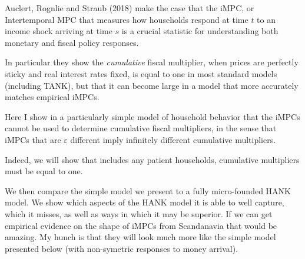 \documentclass{article}
\begin{document}
Auclert, Rognlie and Straub (2018) make the case that the iMPC, or Intertemporal MPC that measures how households respond at time $t$ to an income shock arriving at time $s$ is a crucial statistic for understanding both monetary and fiscal policy responses.

In particular they show the \textit{cumulative} fiscal multiplier, when prices are perfectly sticky and real interest rates fixed, is equal to one in most standard models (including TANK), but that it can become large in a model that more accurately matches empirical iMPCs.

Here I show in a particularly simple model of household behavior that the iMPCs cannot be used to determine cumulative fiscal multipliers, in the sense that iMPCs that are $\varepsilon$ different imply infinitely different cumulative multipliers.

Indeed, we will show that includes any patient households, cumulative multipliers must be equal to one.

We then compare the simple model we present to a fully micro-founded HANK model. We show which aspects of the HANK model it is able to well capture, which it misses, as well as ways in which it may be superior. If we can get empirical evidence on the shape of iMPCs from Scandanavia that would be amazing. My hunch is that they will look much more like the simple model presented below (with non-symetric responses to money arrival).
\end{document}
